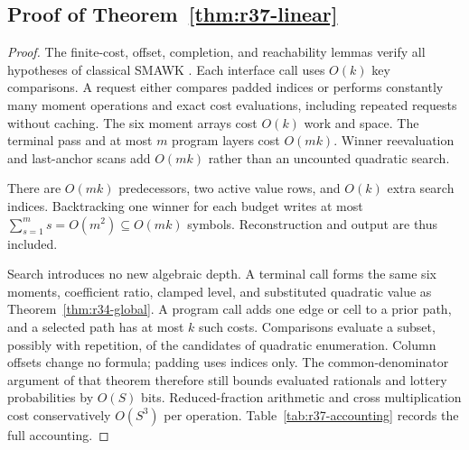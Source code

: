 \subsection{Proof of Theorem~\ref{thm:r37-linear}}\label{ec-proof-thm-r37-linear}
\begin{proof}
The finite-cost, offset, completion, and reachability lemmas verify all hypotheses of classical SMAWK \citep{AggarwalEtAl1987}. Each interface call uses $O(k)$ key comparisons. A request either compares padded indices or performs constantly many moment operations and exact cost evaluations, including repeated requests without caching. The six moment arrays cost $O(k)$ work and space. The terminal pass and at most $m$ program layers cost $O(mk)$. Winner reevaluation and last-anchor scans add $O(mk)$ rather than an uncounted quadratic search.

There are $O(mk)$ predecessors, two active value rows, and $O(k)$ extra search indices. Backtracking one winner for each budget writes at most $\sum_{s=1}^m s=O(m^2)\subseteq O(mk)$ symbols. Reconstruction and output are thus included.

Search introduces no new algebraic depth. A terminal call forms the same six moments, coefficient ratio, clamped level, and substituted quadratic value as Theorem~\ref{thm:r34-global}. A program call adds one edge or cell to a prior path, and a selected path has at most $k$ such costs. Comparisons evaluate a subset, possibly with repetition, of the candidates of quadratic enumeration. Column offsets change no formula; padding uses indices only. The common-denominator argument of that theorem therefore still bounds evaluated rationals and lottery probabilities by $O(S)$ bits. Reduced-fraction arithmetic and cross multiplication cost conservatively $O(S^3)$ per operation. Table~\ref{tab:r37-accounting} records the full accounting.
\end{proof}

